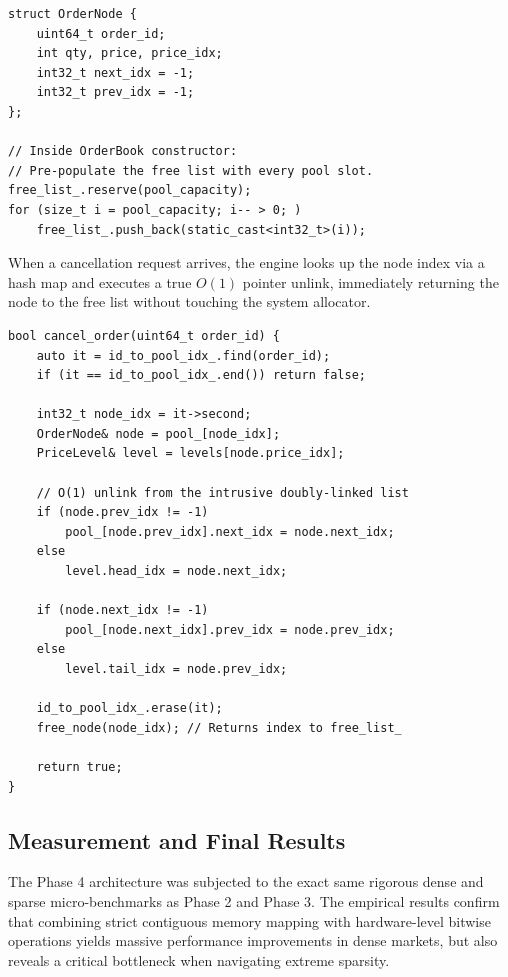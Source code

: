 \documentclass{article}
\begin{document}
\begin{lstlisting}[caption={Intrusive List and Memory Pool Initialization}]
struct OrderNode {
    uint64_t order_id;
    int qty, price, price_idx;
    int32_t next_idx = -1;
    int32_t prev_idx = -1;
};

// Inside OrderBook constructor: 
// Pre-populate the free list with every pool slot.
free_list_.reserve(pool_capacity);
for (size_t i = pool_capacity; i-- > 0; )
    free_list_.push_back(static_cast<int32_t>(i));
\end{lstlisting}

When a cancellation request arrives, the engine looks up the node index via a hash map and executes a true $O(1)$ pointer unlink, immediately returning the node to the free list without touching the system allocator.

\begin{lstlisting}[caption={O(1) Memory Pool Cancellation}]
bool cancel_order(uint64_t order_id) {
    auto it = id_to_pool_idx_.find(order_id);
    if (it == id_to_pool_idx_.end()) return false;

    int32_t node_idx = it->second;
    OrderNode& node = pool_[node_idx];
    PriceLevel& level = levels[node.price_idx];

    // O(1) unlink from the intrusive doubly-linked list
    if (node.prev_idx != -1)
        pool_[node.prev_idx].next_idx = node.next_idx;
    else
        level.head_idx = node.next_idx;

    if (node.next_idx != -1)
        pool_[node.next_idx].prev_idx = node.prev_idx;
    else
        level.tail_idx = node.prev_idx;

    id_to_pool_idx_.erase(it);
    free_node(node_idx); // Returns index to free_list_
    
    return true;
}
\end{lstlisting}

\subsection{Measurement and Final Results}

The Phase 4 architecture was subjected to the exact same rigorous dense and sparse micro-benchmarks as Phase 2 and Phase 3. The empirical results confirm that combining strict contiguous memory mapping with hardware-level bitwise operations yields massive performance improvements in dense markets, but also reveals a critical bottleneck when navigating extreme sparsity.
\end{document}

